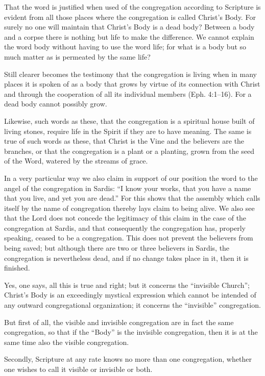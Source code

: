 That the word is justified when used of the congregation according to Scripture is evident from all those places where the congregation is called Christ’s Body. For surely no one will maintain that Christ’s Body is a dead body? Between a body and a corpse there is nothing but life to make the difference. We cannot explain the word body without having to use the word life; for what is a body but so much matter as is permeated by the same life?

Still clearer becomes the testimony that the congregation is living when in many places it is spoken of as a body that grows by virtue of its connection with Christ and through the cooperation of all its individual members (Eph. 4:1–16). For a dead body cannot possibly grow.

Likewise, such words as these, that the congregation is a spiritual house built of living stones, require life in the Spirit if they are to have meaning. The same is true of such words as these, that Christ is the Vine and the believers are the branches, or that the congregation is a plant or a planting, grown from the seed of the Word, watered by the streams of grace.

In a very particular way we also claim in support of our position the word to the angel of the congregation in Sardis: “I know your works, that you have a name that you live, and yet you are dead.” For this shows that the assembly which calls itself by the name of congregation thereby lays claim to being alive. We also see that the Lord does not concede the legitimacy of this claim in the case of the congregation at Sardis, and that consequently the congregation has, properly speaking, ceased to be a congregation. This does not prevent the believers from being saved; but although there are two or three believers in Sardis, the congregation is nevertheless dead, and if no change takes place in it, then it is finished.

Yes, one says, all this is true and right; but it concerns the “invisible Church”; Christ’s Body is an exceedingly mystical expression which cannot be intended of any outward congregational organization; it concerns the “invisible” congregation.

But first of all, the visible and invisible congregation are in fact the same congregation, so that if the “Body” is the invisible congregation, then it is at the same time also the visible congregation.

Secondly, Scripture at any rate knows no more than one congregation, whether one wishes to call it visible or invisible or both.

